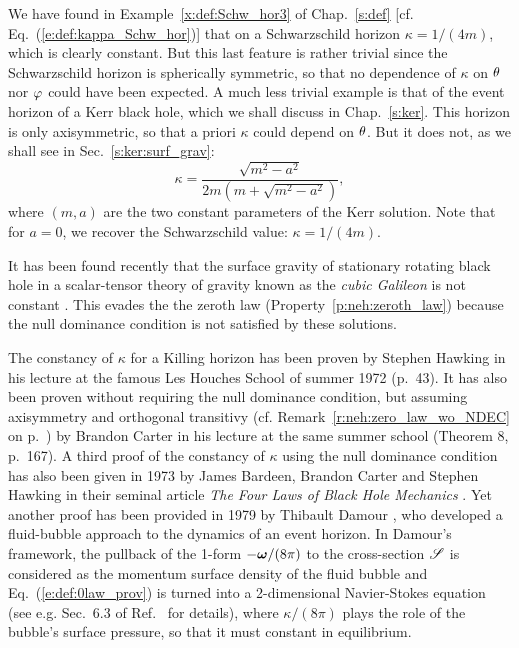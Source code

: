 \begin{example}
\label{x:neh:Schw_Kerr_kappa}
We have found in Example~\ref{x:def:Schw_hor3} of Chap.~\ref{s:def} [cf. Eq.~(\ref{e:def:kappa_Schw_hor})]
that on a Schwarzschild horizon $\kappa = 1/(4m)$,
which is clearly constant. But
this last feature is rather trivial since the Schwarzschild horizon is spherically
symmetric, so that no dependence of $\kappa$ on $\theta$ nor $\varphi$ could have been expected.
A much less trivial example is that of the event horizon of a Kerr black hole,
which we shall discuss in Chap.~\ref{s:ker}. This horizon is only axisymmetric,
so that a priori $\kappa$ could depend on $\theta$. But it does not, as we shall
see in Sec.~\ref{s:ker:surf_grav}:
\[
    \kappa = \frac{\sqrt{m^2 - a^2}}{2m(m + \sqrt{m^2-a^2})} ,
\]
where $(m,a)$ are the two constant parameters of the Kerr solution. Note that for $a=0$,
we recover the Schwarzschild value: $\kappa= 1/(4m)$.
\end{example}

\begin{example}
It has been found recently that the surface gravity of stationary rotating black hole
in a scalar-tensor theory of gravity known as the \emph{cubic Galileon}
is not constant \cite{Grand23}.
This evades the the zeroth law (Property~\ref{p:neh:zeroth_law})
because the null dominance condition is not satisfied by these solutions.
\end{example}

\begin{hist}
The constancy of $\kappa$ for a Killing horizon has been proven by Stephen Hawking
in his lecture at the famous Les Houches School of summer 1972 \cite{Hawki73} (p.~43).
It has also been proven without requiring the null dominance condition, but
assuming axisymmetry and orthogonal transitivy (cf. Remark~\ref{r:neh:zero_law_wo_NDEC} on p.~\pageref{r:neh:zero_law_wo_NDEC}) by Brandon Carter in his lecture at the same summer
school
\cite{Carte73b} (Theorem 8, p.~167).
A third proof of the constancy of $\kappa$ using the null dominance condition
has also been given in 1973 by James Bardeen, Brandon Carter and
Stephen Hawking
in their seminal article \emph{The Four Laws of Black Hole Mechanics}
\cite{BardeCH73}. Yet another proof has been provided in 1979 by Thibault Damour
\cite{Damou79,Damou82}, who developed a fluid-bubble approach to the dynamics of an event horizon.
In Damour's framework, the pullback of the 1-form  $-\bm{\omega}/(8\pi)$ to the cross-section
$\mathscr{S}$ is considered as the momentum surface density of the fluid bubble and Eq.~(\ref{e:def:0law_prov})
is turned into a 2-dimensional Navier-Stokes equation (see e.g. Sec.~6.3 of Ref.~\cite{GourgJ06} for details), where $\kappa/(8\pi)$ plays the role of the
bubble's surface pressure, so that it must constant in equilibrium.
\end{hist}

